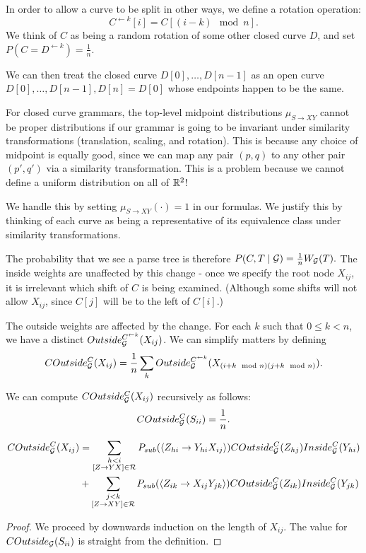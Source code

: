 \documentclass{article}
\begin{document}
In order to allow a curve to be split in other ways, we define a
rotation operation:
$$C^{\leftarrow k}[i] = C[(i-k) \mod n].$$
We think of $C$ as being a random rotation of some other closed
curve $D$, and set $P(C = D^{\leftarrow k}) = \frac{1}{n}$.

We can then treat the closed curve $D[0], \dots, D[n-1]$ as an open
curve $D[0], \dots, D[n-1], D[n]=D[0]$ whose endpoints happen to be
the same.

\begin{rmk}
  For closed curve grammars, the top-level midpoint distributions
  $\mu_{S\to XY}$ cannot be proper distributions if our grammar is
  going to be invariant under similarity transformations (translation,
  scaling, and rotation). This is because any choice of midpoint is
  equally good, since we can map any pair $(p,q)$ to any other pair
  $(p',q')$ via a similarity transformation. This is a problem
  because we cannot define a uniform distribution on all of $\mathbb{R}^2$!

  We handle this by setting $\mu_{S\to XY}(\cdot) = 1$ in our
  formulas. We justify this by thinking of each curve as being a
  representative of its equivalence class under similarity
  transformations.  
\end{rmk}


The probability that we see a parse tree is therefore $P(C,T\mid {\mathcal G})
= \frac{1}{n} W_{{\mathcal G}}(T).$ The inside weights are unaffected by this
change - once we specify the root node $X_{ij}$, it is irrelevant
which shift of $C$ is being examined. (Although some shifts will not
allow $X_{ij}$, since $C[j]$ will be to the left of $C[i]$.)

The outside weights are affected by the change. For each $k$ such that
$0\le k < n$, we have a distinct $Outside_{{\mathcal G}}^{C^{\leftarrow
    k}}(X_{ij})$.
We can simplify matters by defining 
$$COutside_{{\mathcal G}}^C(X_{ij}) = \frac{1}{n} \sum_k
Outside_{{\mathcal G}}^{C^{\leftarrow k}}(X_{(i + k \mod n) (j + k \mod n)}).$$

\begin{prop}
We can compute $COutside_{{\mathcal G}}^C(X_{ij})$ recursively as follows:
$$COutside_{{\mathcal G}}^C(S_{ii}) = \frac{1}{n}.$$

\begin{align*}
COutside_{{\mathcal G}}^C(X_{ij}) &=
   \sum_{\substack{h < i \\ [Z\to YX] \in
    {\mathcal R}}} P_{sub}(\langle Z_{hi} \to Y_{hi}X_{ij} \rangle)
COutside_{{\mathcal G}}^C(Z_{hj}) Inside_{{\mathcal G}}^C(Y_{hi})\\
&+
 \sum_{\substack{j<k \\ [Z\to XY] \in
    {\mathcal R}}} P_{sub}(\langle Z_{ik} \to X_{ij}Y_{jk} \rangle)
COutside_{{\mathcal G}}^C(Z_{ik}) Inside_{{\mathcal G}}^C(Y_{jk})
\end{align*}
\end{prop}
\begin{proof}
We proceed by downwards induction on the length of $X_{ij}$. The value
for $COutside_{{\mathcal G}}(S_{ii})$ is straight from the definition.

\end{proof}
\end{document}
